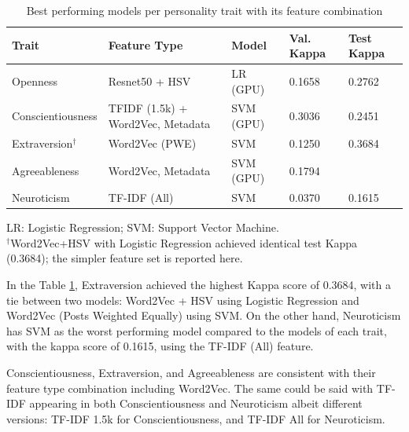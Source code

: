 \begin{table}[H]
	\centering
	\caption{Best performing models per personality trait with its feature combination}
	\label{tab:best_models}
	\begin{tabularx}{\textwidth}{l|X|X|X|l}
		\hline
		\textbf{Trait} & \textbf{Feature Type} & \textbf{Model} & \textbf{Val. Kappa} & \textbf{Test Kappa} \\ \hline
		Openness & Resnet50 + HSV & LR (GPU) & 0.1658 & 0.2762 \\ \hline
		Conscientiousness & TFIDF (1.5k) + Word2Vec, Metadata & SVM (GPU) & 0.3036 & 0.2451 \\ \hline
		Extraversion$^{\dagger}$ & Word2Vec (PWE) & SVM & 0.1250 & 0.3684 \\ \hline
		Agreeableness & Word2Vec, Metadata & SVM (GPU) & 0.1794 &  \\ \hline
		Neuroticism & TF-IDF (All) & SVM & 0.0370 & 0.1615 \\ \hline
	\end{tabularx}
	\vspace{0.5\baselineskip}
	\footnotesize{LR: Logistic Regression; SVM: Support Vector Machine. \\ $^{\dagger}$Word2Vec+HSV with Logistic Regression achieved identical test Kappa (0.3684); the simpler feature set is reported here.}
\end{table}

In the Table \ref{tab:best_models}, Extraversion achieved the highest Kappa score of 0.3684, with a tie between two models: Word2Vec + HSV using Logistic Regression and Word2Vec (Posts Weighted Equally) using SVM. On the other hand, Neuroticism has SVM as the worst performing model compared to the models of each trait, with the kappa score of 0.1615, using the TF-IDF (All) feature.

Conscientiousness, Extraversion, and Agreeableness are consistent with their feature type combination including Word2Vec. The same could be said with TF-IDF appearing in both Conscientiousness and Neuroticism albeit different versions: TF-IDF 1.5k for Conscientiousness, and TF-IDF All for Neuroticism.

